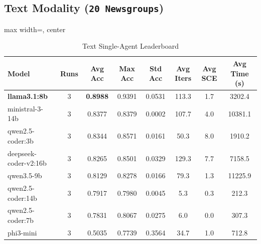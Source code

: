 \documentclass[11pt,a4paper]{article}
\begin{document}
\subsection{Text Modality (\texttt{20 Newsgroups})}

\begin{table}[ht]
\centering
\footnotesize
\setlength{\tabcolsep}{3pt}
\caption{Text Single-Agent Leaderboard}
\label{tab:text_single}
\begin{adjustbox}{max width=\textwidth, center}
\begin{tabular}{>{\raggedright\arraybackslash}p{4.2cm}ccccccc}
\toprule
\textbf{Model} & \textbf{Runs} & \textbf{Avg Acc} & \textbf{Max Acc} & \textbf{Std Acc} & \textbf{Avg Iters} & \textbf{Avg SCE} & \textbf{Avg Time (s)} \\
\midrule
\textbf{llama3.1:8b} & 3 & \textbf{0.8988} & 0.9391 & 0.0531 & 113.3 & 1.7 & 3202.4 \\
ministral-3-14b & 3 & 0.8377 & 0.8379 & 0.0002 & 107.7 & 4.0 & 10381.1 \\
qwen2.5-coder:3b & 3 & 0.8344 & 0.8571 & 0.0161 & 50.3 & 8.0 & 1910.2 \\
deepseek-coder-v2:16b & 3 & 0.8265 & 0.8501 & 0.0329 & 129.3 & 7.7 & 7158.5 \\
qwen3.5-9b & 3 & 0.8129 & 0.8278 & 0.0166 & 79.3 & 1.3 & 11225.9 \\
qwen2.5-coder:14b & 3 & 0.7917 & 0.7980 & 0.0045 & 5.3 & 0.3 & 212.3 \\
qwen2.5-coder:7b & 3 & 0.7831 & 0.8067 & 0.0275 & 6.0 & 0.0 & 307.3 \\
phi3-mini & 3 & 0.5035 & 0.7739 & 0.3564 & 34.7 & 1.0 & 712.8 \\
\bottomrule
\end{tabular}
\end{adjustbox}
\end{table}
\end{document}
